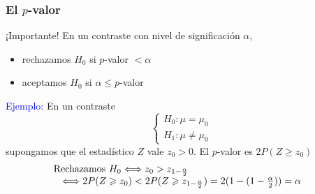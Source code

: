 \documentclass[12pt,t]{beamer}\usepackage[]{graphicx}\usepackage[]{color}
\newcommand{\blue}[1]{\textcolor{blue}{#1}}
\renewcommand{\leq}{\leqslant}
\renewcommand{\geq}{\geqslant}
\theoremstyle{plain}
\theoremstyle{definition}
\begin{document}
\begin{frame}
\frametitle{El $p$-valor}
\vspace*{-3ex}

\begin{block}{¡Importante!}
En un contraste con nivel   de significación   $\alpha$, 
\begin{itemize}
\item rechazamos $H_0$ si $p$-valor $<\alpha$

\item aceptamos $H_0$ si $\alpha\leq p$-valor
\end{itemize}
\end{block}
\medskip

\blue{Ejemplo:} En un contraste
$$
\left\{\begin{array}{l}
H_{0}:\mu=\mu_{0}\\ H_{1}:\mu \neq \mu_{0}
\end{array}
\right.
$$
supongamos  que el estadístico $Z$ vale $z_0>0$. El $p$-valor es $2P(Z \geq z_0)$
$$
\begin{array}{l}
\hspace*{-2ex}\mbox{Rechazamos }  H_0  \Longleftrightarrow z_0>z_{1-\frac{\alpha}{2}}\\
 \Longleftrightarrow 2P(Z \geq z_0)<2P(Z\geq z_{1-\frac{\alpha}{2}})=2(1-(1-\frac{\alpha}{2}))=\alpha
\end{array}
$$
\end{frame}
\end{document}
